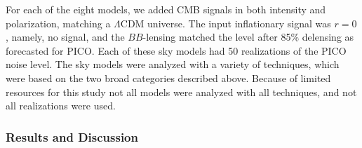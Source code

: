 \documentclass[PICOReport.tex]{subfiles}
\begin{document}
For each of the eight models, we added CMB signals in both intensity and polarization, matching a $\Lambda$CDM universe. The input inflationary signal was $r=0$, namely, no signal, and the $BB$-lensing matched the level after 85\% delensing as forecasted for PICO. Each of these sky models had 50 realizations of the PICO noise level. 
The sky models were analyzed with a variety of techniques, which were based on the two broad categories described above. Because of limited resources for this study not all models were analyzed with all techniques, and not all realizations were used. 

\subsubsection{Results and Discussion}
\label{sec:foregrounds_results}
\end{document}
